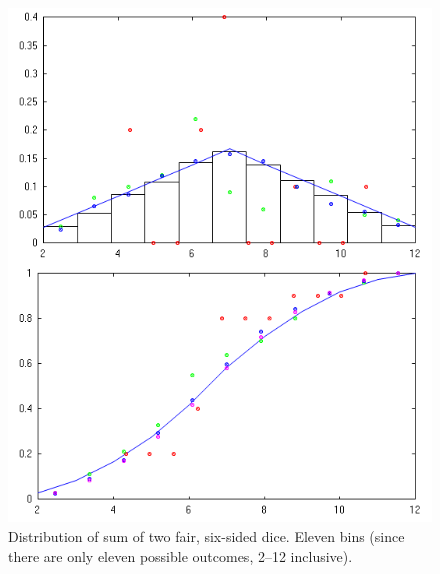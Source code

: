 \documentclass[letterpaper]{article}
\begin{document}
\begin{figure}[ht]
  \centering
  \includegraphics[width=\columnwidth]{2015-11-11_dice.png}
  \caption{\label{fig:dDiceM} Distribution of sum of two fair, six-sided dice.
    Eleven bins (since there are only eleven possible outcomes, 2--12
    inclusive).}
\end{figure}
\end{document}
